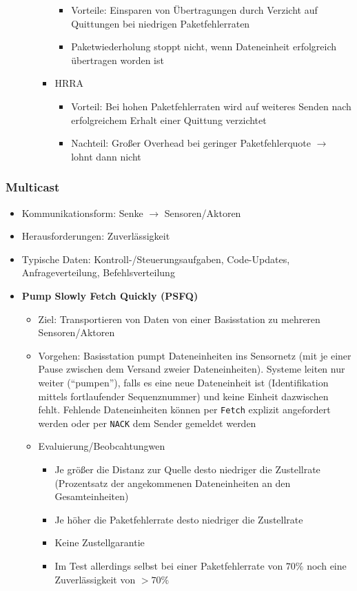 \begin{itemize}
\begin{itemize}
\begin{itemize}
			\begin{itemize}
				\item Vorteile: Einsparen von Übertragungen durch Verzicht auf Quittungen bei niedrigen Paketfehlerraten
				\item Paketwiederholung stoppt nicht, wenn Dateneinheit erfolgreich übertragen worden ist
			\end{itemize}
			\item HRRA
			\begin{itemize}
				\item Vorteil: Bei hohen Paketfehlerraten wird auf weiteres Senden nach erfolgreichem Erhalt einer Quittung verzichtet
				\item Nachteil: Großer Overhead bei geringer Paketfehlerquote \(\rightarrow\) lohnt dann nicht
			\end{itemize}
		\end{itemize}
	\end{itemize}
\end{itemize}

\subsubsection{Multicast}
\begin{itemize}
	\item Kommunikationsform: Senke \(\rightarrow\) Sensoren/Aktoren
	\item Herausforderungen: Zuverlässigkeit
	\item Typische Daten: Kontroll-/Steuerungsaufgaben, Code-Updates, Anfrageverteilung, Befehlsverteilung
	\item \textbf{Pump Slowly Fetch Quickly (PSFQ)}
	\begin{itemize}
		\item Ziel: Transportieren von Daten von einer Basisstation zu mehreren Sensoren/Aktoren
		\item Vorgehen: Basisstation pumpt Dateneinheiten ins Sensornetz (mit je einer Pause zwischen dem Versand zweier Dateneinheiten). Systeme leiten nur weiter ("`pumpen"'), falls es eine neue Dateneinheit ist (Identifikation mittels fortlaufender Sequenznummer) und keine Einheit dazwischen fehlt. Fehlende Dateneinheiten können per \texttt{Fetch} explizit angefordert werden oder per \texttt{NACK} dem Sender gemeldet werden
		\item Evaluierung/Beobcahtungwen
		\begin{itemize}
			\item Je größer die Distanz zur Quelle desto niedriger die Zustellrate (Prozentsatz der angekommenen Dateneinheiten an den Gesamteinheiten)
			\item Je höher die Paketfehlerrate desto niedriger die Zustellrate
			\item Keine Zustellgarantie
			\item Im Test allerdings selbst bei einer Paketfehlerrate von \(70\%\) noch eine Zuverlässigkeit von \(>70\%\)
		\end{itemize}
	\end{itemize}
\end{itemize}

